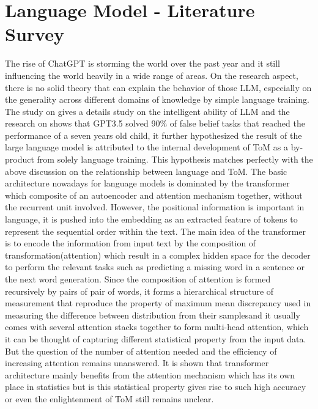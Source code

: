 \documentclass[12pt]{article}
\begin{document}
\section{Language Model - Literature Survey} 
The rise of ChatGPT is storming the world over the past year and it still influencing the world heavily in a wide range of areas. On the research aspect, there is no solid theory that can explain the behavior of those LLM, especially on the generality across different domains of knowledge by simple language training\cite{Bubeck_2023}. The study on\cite{Bubeck_2023} gives a details study on the intelligent ability of LLM and the research on \cite{Kosinski_2023} shows that GPT3.5 solved 90\% of false belief tasks that reached the performance of a seven years old child, it further hypothesized the result of the large language model is attributed to the internal development of ToM as a by-product from solely language training. This hypothesis matches perfectly with the above discussion on the relationship between language and ToM. 
The basic architecture nowadays for language models is dominated by the transformer which composite of an autoencoder and attention mechanism together, without the recurrent unit involved\cite{Ghojogh_2020}. However, the positional information is important in language, it is pushed into the embedding as an extracted feature of tokens to represent the sequential order within the text. The main idea of the transformer is to encode the information from input text by the composition of transformation(attention) which result in a complex hidden space for the decoder to perform the relevant tasks such as predicting a missing word in a sentence or the next word generation\cite{Ghojogh_2020}. Since the composition of attention is formed recursively by pairs of pair of words, it forms a hierarchical structure of measurement that reproduce the property of maximum mean discrepancy used in measuring the difference between distribution from their samples\cite{Ghojogh_2020}and it usually comes with several attention stacks together to form multi-head attention, which it can be thought of capturing different statistical property from the input data. 
But the question of the number of attention needed and the efficiency of increasing attention remains unanswered\cite{Merty_2019}. 
It is shown that transformer architecture mainly benefits from the attention mechanism which has its own place in statistics but is this statistical property gives rise to such high accuracy or even the enlightenment of ToM still remains unclear.
\end{document}
